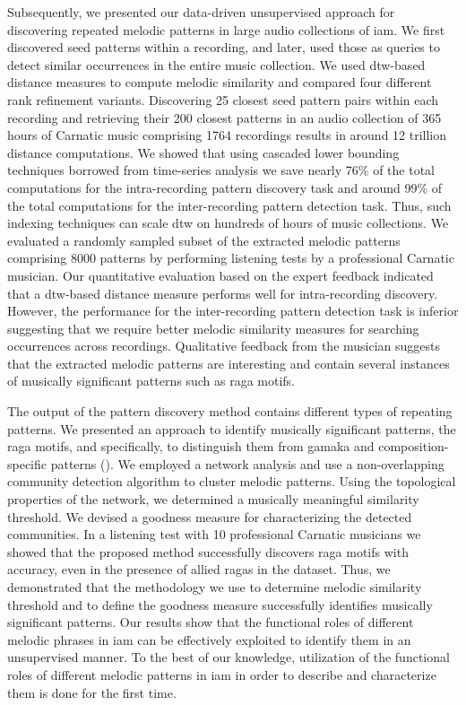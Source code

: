 {Subsequently, we presented our data-driven unsupervised approach for discovering repeated melodic patterns in large audio collections of \gls{iam}. We first discovered seed patterns within a recording, and later, used those as queries to detect similar occurrences in the entire music collection. We used \gls{dtw}-based distance measures to compute melodic similarity and compared four different rank refinement variants. Discovering 25 closest seed pattern pairs within each recording and retrieving their 200 closest patterns in an audio collection of 365\,hours of Carnatic music comprising 1764 recordings results in around 12 trillion distance computations. We showed that using cascaded lower bounding techniques borrowed from time-series analysis we save nearly 76\% of the total computations for the intra-recording pattern discovery task and around 99\% of the total computations for the inter-recording pattern detection task. Thus, such indexing techniques can scale \gls{dtw} on hundreds of hours of music collections. We evaluated a randomly sampled subset of the extracted melodic patterns comprising 8000 patterns by performing listening tests by a professional Carnatic musician. Our quantitative evaluation based on the expert feedback indicated that a \gls{dtw}-based distance measure performs well for intra-recording discovery. However, the performance for the inter-recording pattern detection task is inferior suggesting that we require better melodic similarity measures for searching occurrences across recordings. Qualitative feedback from the musician suggests that the extracted melodic patterns are interesting and contain several instances of musically significant patterns such as \gls{raga} motifs. 

The output of the pattern discovery method contains different types of repeating patterns. We presented an approach to identify musically significant patterns, the \gls{raga} motifs, and specifically, to distinguish them from \gls{gamaka} and composition-specific patterns (). We employed a network analysis and use a non-overlapping community detection algorithm to cluster melodic patterns. Using the topological properties of the network, we determined a musically meaningful similarity threshold. We devised a goodness measure for characterizing the detected communities. In a listening test with 10 professional Carnatic musicians we showed that the proposed method successfully discovers \gls{raga} motifs with accuracy, even in the presence of allied \glspl{raga} in the dataset. Thus, we demonstrated that the methodology we use to determine melodic similarity threshold and to define the goodness measure successfully identifies musically significant patterns. Our results show that the functional roles of different melodic phrases in \gls{iam} can be effectively exploited to identify them in an unsupervised manner. To the best of our knowledge, utilization of the functional roles of different melodic patterns in \gls{iam} in order to describe and characterize them is done for the first time.

}
